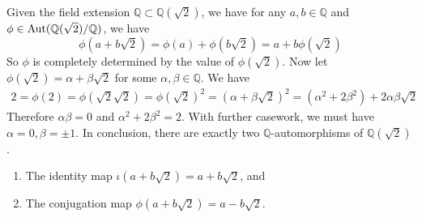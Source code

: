   \begin{example}
    Given the field extension $\mathbb{Q} \subset \mathbb{Q}(\sqrt{2})$, we have for any $a, b \in \mathbb{Q}$ and $\phi \in \Aut(\mathbb{Q}(\sqrt{2})/\mathbb{Q})$, we have 
    \begin{equation}
      \phi(a + b \sqrt{2}) = \phi(a) + \phi(b \sqrt{2}) = a + b \phi(\sqrt{2}) 
    \end{equation}
    So $\phi$ is completely determined by the value of $\phi(\sqrt{2})$. Now let $\phi(\sqrt{2}) = \alpha + \beta \sqrt{2}$ for some $\alpha, \beta \in \mathbb{Q}$. We have 
    \begin{align}
      2 = \phi(2) = \phi(\sqrt{2} \sqrt{2}) = \phi(\sqrt{2})^2 = (\alpha + \beta\sqrt{2})^2 = (\alpha^2 + 2 \beta^2) + 2 \alpha \beta \sqrt{2} 
    \end{align}
    Therefore $\alpha \beta = 0$ and $\alpha^2 + 2 \beta^2 = 2$. With further casework, we must have $\alpha = 0, \beta = \pm 1$. In conclusion, there are exactly two $\mathbb{Q}$-automorphisms of $\mathbb{Q}(\sqrt{2})$. 
    \begin{enumerate}
      \item The identity map $\iota(a + b \sqrt{2}) = a + b \sqrt{2}$, and 
      \item The conjugation map $\phi(a + b \sqrt{2}) = a - b \sqrt{2}$. 
    \end{enumerate}
  \end{example}

